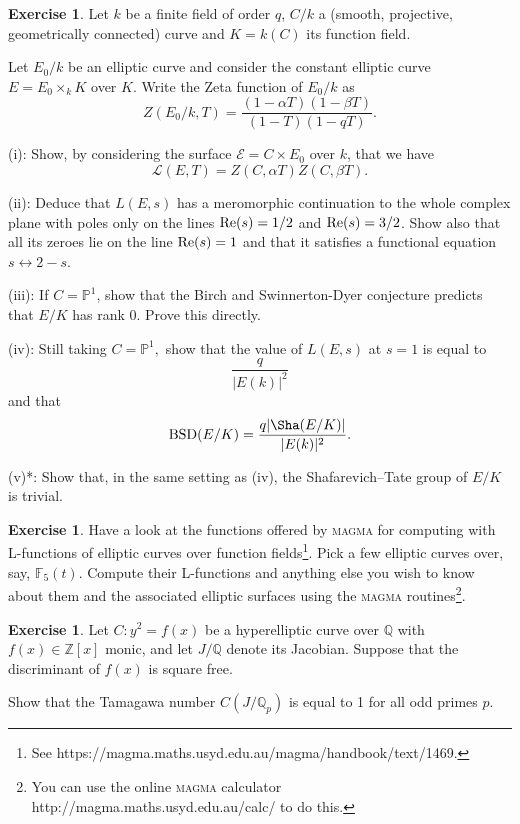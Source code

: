 \documentclass[12pt]{amsart}
\numberwithin{equation}{section}
\theoremstyle{remark}
\theoremstyle{definition}
\theoremstyle{definition}
\theoremstyle{definition}
\theoremstyle{definition}
\theoremstyle{definition}
\theoremstyle{definition}
\newtheorem{exercise}[equation]{Exercise}
\theoremstyle{definition}
\begin{document}
\begin{exercise}
Let $k$ be a finite field of order $q$, $C/k$ a (smooth, projective, geometrically connected) curve and $K=k(C)$ its function field. 

Let $E_0/k$ be an elliptic curve and consider the constant elliptic curve $E=E_0\times_k K $
over $K$. Write the Zeta function of $E_0/k$ as
\[Z(E_0/k,T)=\frac{(1-\alpha T)(1-\beta T)}{(1-T)(1-qT)}.\]

(i): Show, by considering the surface  $\mathcal{E}=C\times E_0$ over $k$, that we have
\[\mathcal{L}(E,T)=Z(C,\alpha T)Z(C,\beta T).\]

(ii): Deduce that $L(E,s)$ has a meromorphic continuation to the whole complex plane with poles only on the lines $\textup{Re}(s)=1/2$ and $\textup{Re}(s)=3/2$. Show also that all its zeroes lie on the line $\textup{Re}(s)=1$ and that it satisfies a functional equation $s\leftrightarrow 2-s$. 

(iii): If $C=\mathbb{P}^1$, show that the Birch and Swinnerton-Dyer conjecture predicts that $E/K$ has rank 0. Prove this directly.  

(iv): Still taking $C=\mathbb{P}^1,$ show that the value of $L(E,s)$ at $s=1$ is equal to
\[\frac{q}{|E(k)|^2}\]
and that \[\textup{BSD}(E/K)=\frac{q|\Sha(E/K)|}{|E(k)|^2}.\]

(v)*: Show that, in the same setting as (iv), the Shafarevich--Tate group of $E/K$ is trivial. 
\end{exercise}

\begin{exercise}
Have a look at the functions offered by \textsc{magma} for computing with L-functions of elliptic curves over function fields\footnote{See 
https://magma.maths.usyd.edu.au/magma/handbook/text/1469.}. Pick a few elliptic curves over, say, $\mathbb{F}_5(t)$. Compute their L-functions and anything else you wish to know about them and the associated elliptic surfaces using the \textsc{magma} routines\footnote{You can use the online \textsc{magma} calculator http://magma.maths.usyd.edu.au/calc/ to do this.}.
\end{exercise}

\begin{exercise}
Let $C:y^2=f(x)$ be a hyperelliptic curve over $\mathbb{Q}$ with $f(x)\in \mathbb{Z}[x]$ monic, and let $J/\mathbb{Q}$ denote its Jacobian. Suppose that the discriminant of $f(x)$ is square free. 

Show that the Tamagawa number $C(J/\mathbb{Q}_p)$ is equal to 1 for all odd primes $p$.
\end{exercise}
\end{document}
